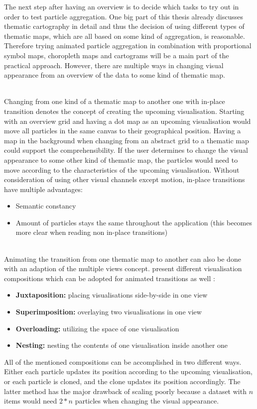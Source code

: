 The next step after having an overview is to decide which tasks to try out in order to test particle aggregation. One big part of this thesis already discusses thematic cartography in detail and thus the decision of using different types of thematic maps, which are all based on some kind of aggregation, is reasonable. Therefore trying animated particle aggregation in combination with proportional symbol maps, choropleth maps and cartograms will be a main part of the practical approach. However, there are multiple ways in changing visual appearance from an overview of the data to some kind of thematic map.

\begin{enumerate}

 \hfill \\
Changing from one kind of a thematic map to another one with in-place transition denotes the concept of creating the upcoming visualisation. Starting with an overview grid and having a dot map as an upcoming visualisation would move all particles in the same canvas to their geographical position. Having a map in the background when changing from an abstract grid to a thematic map could support the comprehensibility.
If the user determines to change the visual appearance to some other kind of thematic map, the particles would need to move according to the characteristics of the upcoming visualisation. Without consideration of using other visual channels except motion, in-place transitions have multiple advantages:
\begin{itemize}
\item Semantic constancy
\item Amount of particles stays the same throughout the application (this becomes more clear when reading non in-place transitions)
\end{itemize}

 \hfill \\
Animating the transition from one thematic map to another can also be done with an adaption of the multiple views concept. \citeauthor{Javed2012} present different visualisation compositions which can be adopted for animated transitions as well :
\begin{itemize}
\item \textbf{Juxtaposition:} placing visualisations side-by-side in one view
\item \textbf{Superimposition:} overlaying two visualisations in one view
\item \textbf{Overloading:} utilizing the space of one visualisation
\item \textbf{Nesting:} nesting the contents of one visualisation inside another one
\end{itemize}

All of the mentioned compositions can be accomplished in two different ways. Either each particle updates its position according to the upcoming visualisation, or each particle is cloned, and the clone updates its position accordingly. The latter method has the major drawback of scaling poorly because a dataset with $n$ items would need $2*n$ particles when changing the visual appearance.
\end{enumerate}

